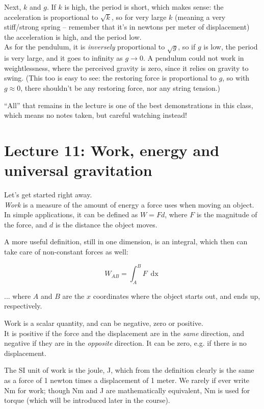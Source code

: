 \documentclass[12pt,a4paper]{report}
\begin{document}
Next, $k$ and $g$. If $k$ is high, the period is short, which makes sense: the acceleration is proportional to $\sqrt{k}$, so for very large $k$ (meaning a very stiff/strong spring -- remember that it's in newtons per meter of displacement) the acceleration is high, and the period low.\\
As for the pendulum, it is \emph{inversely} proportional to $\sqrt{g}$, so if $g$ is low, the period is very large, and it goes to infinity as $g \to 0$. A pendulum could not work in weightlessness, where the perceived gravity is zero, since it relies on gravity to swing. (This too is easy to see: the restoring force is proportional to $g$, so with $g \approx 0$, there shouldn't be any restoring force, nor any string tension.)

``All'' that remains in the lecture is one of the best demonstrations in this class, which means no notes taken, but careful watching instead!

\section{Lecture 11: Work, energy and universal gravitation}

Let's get started right away.\\
\emph{Work} is a measure of the amount of energy a force uses when moving an object. In simple applications, it can be defined as $W = F d$, where $F$ is the magnitude of the force, and $d$ is the distance the object moves.

A more useful definition, still in one dimension, is an integral, which then can take care of non-constant forces as well:

\begin{equation}
W_{AB} = \int_A^B F\ \mathop{dx}
\end{equation}

... where $A$ and $B$ are the $x$ coordinates where the object starts out, and ends up, respectively.

Work is a scalar quantity, and can be negative, zero or positive.\\
It is positive if the force and the displacement are in the \emph{same} direction, and negative if they are in the \emph{opposite} direction. It can be zero, e.g. if there is no displacement.

The SI unit of work is the joule, J, which from the definition clearly is the same as a force of 1 newton times a displacement of 1 meter. We rarely if ever write Nm for work; though Nm and J are mathematically equivalent, Nm is used for torque (which will be introduced later in the course).
\end{document}
